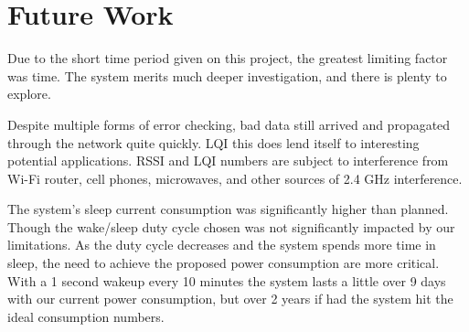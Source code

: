 \section{Future Work}
\label{section:future_work}

Due to the short time period given on this project, the greatest limiting factor was time. The system merits much deeper investigation, and there is plenty to explore.

Despite multiple forms of error checking, bad data still arrived and propagated through the network quite quickly. LQI this does lend itself to interesting potential applications. RSSI and LQI numbers are subject to interference from Wi-Fi router, cell phones, microwaves, and other sources of 2.4 GHz interference.

The system's sleep current consumption was significantly higher than planned. Though the wake/sleep duty cycle chosen was not significantly impacted by our limitations. As the duty cycle decreases and the system spends more time in sleep, the need to achieve the proposed power consumption are more critical. With a 1 second wakeup every 10 minutes the system lasts a little over 9 days with our current power consumption, but over 2 years if had the system hit the ideal consumption numbers.